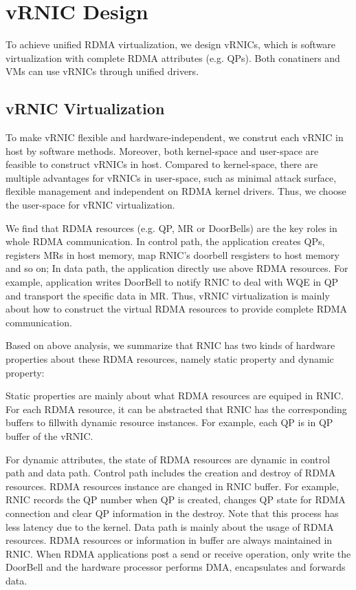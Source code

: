 \section{vRNIC Design}
To achieve unified RDMA virtualization, we design vRNICs, which is software virtualization with complete RDMA attributes (e.g. QPs). Both conatiners and VMs can use vRNICs through unified drivers. 

\subsection{vRNIC Virtualization}
To make vRNIC flexible and hardware-independent, we construt each vRNIC in host by software methods. Moreover, both kernel-space and user-space are feasible to construct vRNICs in host. Compared to kernel-space, there are multiple advantages for vRNICs in user-space, such as minimal attack surface, flexible management and independent on RDMA kernel drivers. Thus, we choose the user-space for vRNIC virtualization.

We find that RDMA resources (e.g. QP, MR or DoorBells) are the key roles in whole RDMA communication. In control path, the application creates QPs, registers MRs in host memory, map RNIC's doorbell resgisters to host memory and so on; In data path, the application directly use above RDMA resources. For example, application writes DoorBell to notify RNIC to deal with WQE in QP and transport the specific data in MR. Thus, vRNIC virtualization is mainly about how to construct the virtual RDMA resources to provide complete RDMA communication. 

Based on above analysis, we summarize that RNIC has two kinds of hardware properties about these RDMA resources, namely static property and dynamic property:

Static properties are mainly about what RDMA resources are equiped in RNIC. For each RDMA resource, it can be abstracted that RNIC has the corresponding buffers to fillwith dynamic resource instances. For example, each QP is in QP buffer of the vRNIC.

For dynamic attributes, the state of RDMA resources are dynamic in control path and data path. Control path includes the creation and destroy of RDMA resources. RDMA resources instance are changed in RNIC buffer. For example, RNIC records the QP number when QP is created, changes QP state for RDMA connection and clear QP information in the destroy. Note that this process has less latency due to the kernel. Data path is mainly about the usage of RDMA resources. RDMA resources or information in buffer are always maintained in RNIC. When RDMA applications post a send or receive operation, only write the DoorBell and the hardware processor performs DMA, encapsulates and forwards data.

